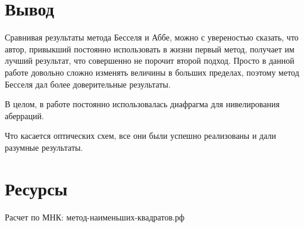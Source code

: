 \documentclass{astroedu-lab}
\begin{document}
\begin{problem}
%
%
%
%
%
%
%
%


\section{Вывод}

Сравнивая результаты метода Бесселя и Аббе, можно с увереностью сказать, что автор, привыкший постоянно использовать в жизни первый метод, получает им лучший результат, что совершенно не порочит второй подход. Просто в данной работе довольно сложно изменять величины в больших пределах, поэтому метод Бесселя дал более доверительные результаты.

В целом, в работе постоянно использовалась диафрагма для нивелирования аберраций.

Что касается оптических схем, все они были успешно реализованы и дали разумные результаты.

\section{Ресурсы}

Расчет по МНК: метод-наименьших-квадратов.рф


\end{problem}
\end{document}
